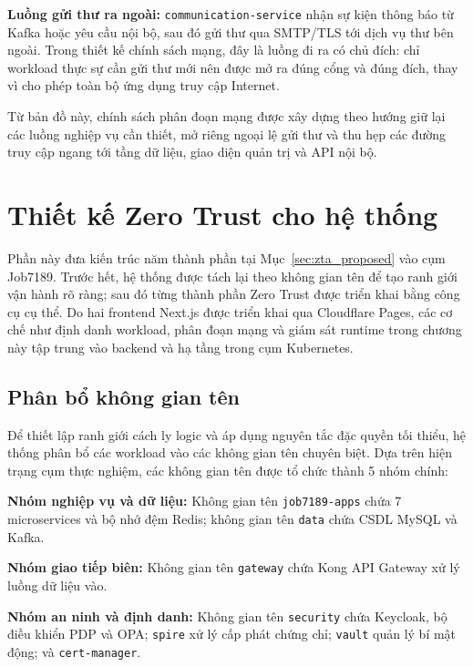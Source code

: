 \textbf{Luồng gửi thư ra ngoài:} \texttt{communication-service} nhận sự kiện thông báo từ Kafka hoặc yêu cầu nội bộ, sau đó gửi thư qua SMTP/TLS tới dịch vụ thư bên ngoài. Trong thiết kế chính sách mạng, đây là luồng đi ra có chủ đích: chỉ workload thực sự cần gửi thư mới nên được mở ra đúng cổng và đúng đích, thay vì cho phép toàn bộ ứng dụng truy cập Internet.

Từ bản đồ này, chính sách phân đoạn mạng được xây dựng theo hướng giữ lại các luồng nghiệp vụ cần thiết, mở riêng ngoại lệ gửi thư và thu hẹp các đường truy cập ngang tới tầng dữ liệu, giao diện quản trị và API nội bộ.

\section{Thiết kế Zero Trust cho hệ thống}
\label{sec:c3_zta_design}

Phần này đưa kiến trúc năm thành phần tại Mục~\ref{sec:zta_proposed} vào cụm Job7189. Trước hết, hệ thống được tách lại theo không gian tên để tạo ranh giới vận hành rõ ràng; sau đó từng thành phần Zero Trust được triển khai bằng công cụ cụ thể. Do hai frontend Next.js được triển khai qua Cloudflare Pages, các cơ chế như định danh workload, phân đoạn mạng và giám sát runtime trong chương này tập trung vào backend và hạ tầng trong cụm Kubernetes.

\subsection{Phân bổ không gian tên}
\label{subsec:c3_namespace_layout}

Để thiết lập ranh giới cách ly logic và áp dụng nguyên tắc đặc quyền tối thiểu, hệ thống phân bổ các workload vào các không gian tên chuyên biệt. Dựa trên hiện trạng cụm thực nghiệm, các không gian tên được tổ chức thành 5 nhóm chính:

\textbf{Nhóm nghiệp vụ và dữ liệu:} Không gian tên \texttt{job7189-apps} chứa 7 microservices và bộ nhớ đệm Redis; không gian tên \texttt{data} chứa CSDL MySQL và Kafka.

\textbf{Nhóm giao tiếp biên:} Không gian tên \texttt{gateway} chứa Kong API Gateway xử lý luồng dữ liệu vào.

\textbf{Nhóm an ninh và định danh:} Không gian tên \texttt{security} chứa Keycloak, bộ điều khiển PDP và OPA; \texttt{spire} xử lý cấp phát chứng chỉ; \texttt{vault} quản lý bí mật động; và \texttt{cert-manager}.

